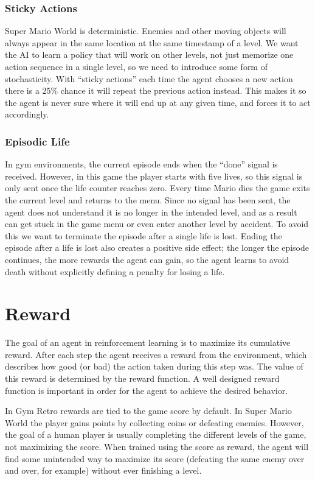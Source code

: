 \documentclass{article}
\begin{document}
\subsubsection{Sticky Actions}
Super Mario World is deterministic. 
Enemies and other moving objects will always appear in the same location at the same timestamp of a level.
We want the AI to learn a policy that will work on other levels, not just memorize one action sequence in a single level, so we need to introduce some form of stochasticity.
With ``sticky actions'' \cite{machado2018revisiting} each time the agent chooses a new action there is a 25\% chance it will repeat the previous action instead.
This makes it so the agent is never sure where it will end up at any given time, and forces it to act accordingly.

\subsubsection{Episodic Life}
In gym environments, the current episode ends when the ``done'' signal is received.
However, in this game the player starts with five lives, so this signal is only sent once the life counter reaches zero.
Every time Mario dies the game exits the current level and returns to the menu.
Since no signal has been sent, the agent does not understand it is no longer in the intended level, and as a result can get stuck in the game menu or even enter another level by accident.
To avoid this we want to terminate the episode after a single life is lost.
Ending the episode after a life is lost also creates a positive side effect; the longer the episode continues, the more rewards the agent can gain, so the agent learns to avoid death without explicitly defining a penalty for losing a life.

\section{Reward}
The goal of an agent in reinforcement learning is to maximize its cumulative reward.
After each step the agent receives a reward from the environment, which describes how good (or bad) the action taken during this step was.
The value of this reward is determined by the reward function.
A well designed reward function is important in order for the agent to achieve the desired behavior.

In Gym Retro rewards are tied to the game score by default.
In Super Mario World the player gains points by collecting coins or defeating enemies.
However, the goal of a human player is usually completing the different levels of the game, not maximizing the score.
When trained using the score as reward, the agent will find some unintended way to maximize its score (defeating the same enemy over and over, for example) without ever finishing a level.
\end{document}
